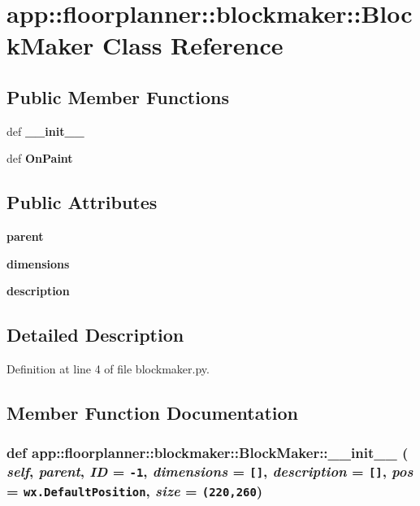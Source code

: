 \section{app::floorplanner::blockmaker::BlockMaker Class Reference}
\label{classapp_1_1floorplanner_1_1blockmaker_1_1BlockMaker}
\subsection*{Public Member Functions}
\begin{CompactItemize}
\item 
def {\bf \_\-\_\-init\_\-\_\-}
\item 
def {\bf OnPaint}
\end{CompactItemize}
\subsection*{Public Attributes}
\begin{CompactItemize}
\item 
{\bf parent}
\item 
{\bf dimensions}
\item 
{\bf description}
\end{CompactItemize}


\subsection{Detailed Description}


Definition at line 4 of file blockmaker.py.

\subsection{Member Function Documentation}
\subsubsection{\setlength{\rightskip}{0pt plus 5cm}def app::floorplanner::blockmaker::BlockMaker::\_\-\_\-init\_\-\_\- ( {\em self},  {\em parent},  {\em ID} = {\tt -1},  {\em dimensions} = {\tt []},  {\em description} = {\tt []},  {\em pos} = {\tt wx.DefaultPosition},  {\em size} = {\tt (220,260})}\label{classapp_1_1floorplanner_1_1blockmaker_1_1BlockMaker_93ed23aaacb6729973a7ebed8e39d78a}




